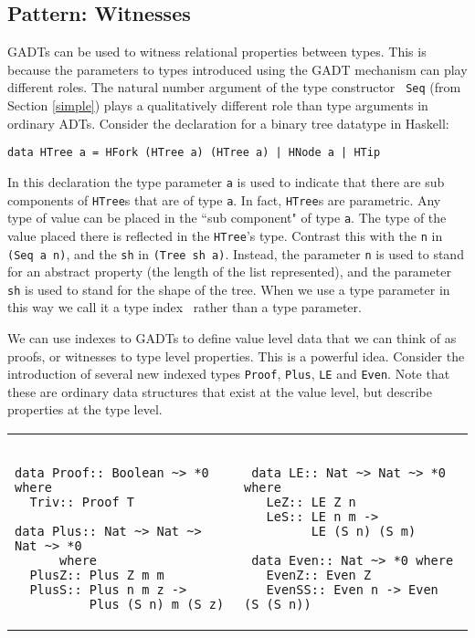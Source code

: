 \documentclass[11pt,twoside,A4]{llncs}
\begin{document}
\subsection{Pattern: Witnesses} \label{witness}

GADTs can be used to witness relational properties
between types. This is because the parameters to types introduced
using the GADT mechanism can play different roles.
The natural number argument of the type constructor {\tt
Seq} (from Section \ref{simple}) plays a qualitatively
different role than type arguments in ordinary ADTs.
Consider the declaration for a binary tree datatype in Haskell:

{\small\begin{verbatim} 
data HTree a = HFork (HTree a) (HTree a) | HNode a | HTip
\end{verbatim}}
\noindent
In this declaration the type parameter {\tt a} is used to
indicate that there are sub components of {\tt HTree}s that
are of type {\tt a}. In fact, {\tt HTree}s are parametric.
Any type of value can be placed in the ``sub component" of
type {\tt a}. The type of the value placed there is
reflected in the {\tt HTree}'s type. Contrast this with the
{\tt n} in {\tt (Seq a n)}, and the {\tt sh} in {\tt (Tree sh a)}. Instead, the parameter {\tt n}
is used to stand for an abstract property (the length of the
list represented), and the parameter {\tt sh} is used to stand for the
shape of the tree. When we use a type parameter in this way
we call it a type index~\cite{XiThesis,Xi:1999:DTP} rather than a type parameter.

We can use indexes to GADTs to define value level data that
we can think of as proofs, or witnesses to type level
properties. This is a powerful idea. Consider the
introduction of several new indexed types {\tt Proof}, {\tt Plus}, {\tt LE} and
{\tt Even}. Note that these are ordinary data structures that
exist at the value level, but describe properties at
the type level.
\vspace*{.3in}
\noindent
\begin{tabular}{l|l}
\begin{minipage}[t]{2.3in}
{\small
\begin{verbatim}

data Proof:: Boolean ~> *0 where
  Triv:: Proof T

data Plus:: Nat ~> Nat ~> Nat ~> *0 
      where
  PlusZ:: Plus Z m m
  PlusS:: Plus n m z -> 
          Plus (S n) m (S z)
\end{verbatim}}
\end{minipage}
&
\begin{minipage}[t]{2.6in}
{\small
\begin{verbatim} 

 data LE:: Nat ~> Nat ~> *0 where
   LeZ:: LE Z n
   LeS:: LE n m -> 
         LE (S n) (S m)

 data Even:: Nat ~> *0 where
   EvenZ:: Even Z
   EvenSS:: Even n -> Even (S (S n))
\end{verbatim}}
\end{minipage}
\end{tabular}
\end{document}
